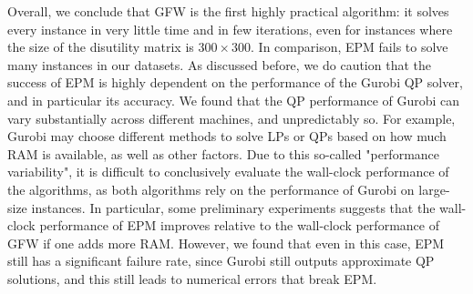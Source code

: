 \documentclass[format=acmsmall,authorversion]{acmart}
\newcommand{\ntl}[1]{{\textcolor{teal}{Tianlong: #1}}}
\begin{document}
Overall, we conclude that GFW is the first highly practical algorithm: it solves every instance in very little time and in few iterations, even for instances where the size of the disutility matrix is $300\times 300$. In comparison, EPM fails to solve many instances in our datasets.
As discussed before, we do caution that the success of EPM is highly dependent on the performance of the Gurobi QP solver, and in particular its accuracy. We found that the QP performance of Gurobi can vary substantially across different machines, and unpredictably so.
For example, Gurobi may choose different methods to solve LPs or QPs based on how much RAM is available, as well as other factors. 
Due to this so-called "performance variability", it is difficult to conclusively evaluate the wall-clock performance of the algorithms, as both algorithms rely on the performance of Gurobi on large-size instances. 
In particular, some preliminary experiments suggests that the wall-clock performance of EPM improves relative to the wall-clock performance of GFW if one adds more RAM.
However, we found that even in this case, EPM still has a significant failure rate, since Gurobi still outputs approximate QP solutions, and this still leads to numerical errors that break EPM.


\end{document}
